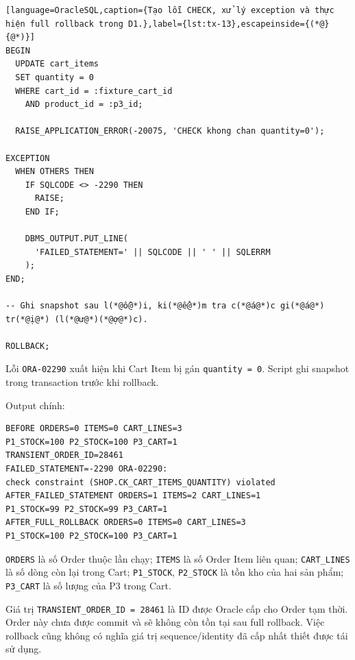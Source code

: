 \reportblockspace{72pt}
\begin{lstlisting}[language=OracleSQL,caption={Tạo lỗi CHECK, xử lý exception và thực hiện full rollback trong D1.},label={lst:tx-13},escapeinside={(*@}{@*)}]
BEGIN
  UPDATE cart_items
  SET quantity = 0
  WHERE cart_id = :fixture_cart_id
    AND product_id = :p3_id;

  RAISE_APPLICATION_ERROR(-20075, 'CHECK khong chan quantity=0');

EXCEPTION
  WHEN OTHERS THEN
    IF SQLCODE <> -2290 THEN
      RAISE;
    END IF;

    DBMS_OUTPUT.PUT_LINE(
      'FAILED_STATEMENT=' || SQLCODE || ' ' || SQLERRM
    );
END;

-- Ghi snapshot sau l(*@ỗ@*)i, ki(*@ể@*)m tra c(*@á@*)c gi(*@á@*) tr(*@ị@*) (l(*@ư@*)(*@ợ@*)c).

ROLLBACK;
\end{lstlisting}

Lỗi \texttt{ORA-\allowbreak{}02290} xuất hiện khi Cart Item bị gán \texttt{quantity =\allowbreak{} 0}. Script ghi snapshot trong transaction trước khi rollback.

Output chính:

\reportblockspace{72pt}
\begingroup
{}\label{result:tx-8}
\nopagebreak[4]
\begin{Verbatim}
BEFORE ORDERS=0 ITEMS=0 CART_LINES=3
P1_STOCK=100 P2_STOCK=100 P3_CART=1
TRANSIENT_ORDER_ID=28461
FAILED_STATEMENT=-2290 ORA-02290:
check constraint (SHOP.CK_CART_ITEMS_QUANTITY) violated
AFTER_FAILED_STATEMENT ORDERS=1 ITEMS=2 CART_LINES=1
P1_STOCK=99 P2_STOCK=99 P3_CART=1
AFTER_FULL_ROLLBACK ORDERS=0 ITEMS=0 CART_LINES=3
P1_STOCK=100 P2_STOCK=100 P3_CART=1
\end{Verbatim}
\endgroup\par\smallskip
\texttt{ORDERS} là số Order thuộc lần chạy; \texttt{ITEMS} là số Order Item liên quan; \texttt{CART\_\allowbreak{}LINES} là số dòng còn lại trong Cart; \texttt{P1\_\allowbreak{}STOCK}, \texttt{P2\_\allowbreak{}STOCK} là tồn kho của hai sản phẩm; \texttt{P3\_\allowbreak{}CART} là số lượng của P3 trong Cart.

Giá trị \texttt{TRANSIENT\_\allowbreak{}ORDER\_\allowbreak{}ID =\allowbreak{} 28461} là ID được Oracle cấp cho Order tạm thời. Order này chưa được commit và sẽ không còn tồn tại sau full rollback. Việc rollback cũng không có nghĩa giá trị sequence/identity đã cấp nhất thiết được tái sử dụng.

